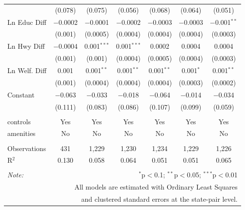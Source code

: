 \begin{table}[!htbp]
\begin{tabular}{@{\extracolsep{5pt}}lcccccc}
  & (0.078) & (0.075) & (0.056) & (0.068) & (0.064) & (0.051) \\ 
  Ln Educ Diff & $-$0.0002 & $-$0.0001 & $-$0.0002 & $-$0.0003 & $-$0.0003 & $-$0.001$^{**}$ \\ 
  & (0.001) & (0.0005) & (0.0004) & (0.0004) & (0.0004) & (0.0003) \\ 
  Ln Hwy Diff & $-$0.0004 & 0.001$^{***}$ & 0.001$^{***}$ & 0.0002 & 0.0004 & 0.0004 \\ 
  & (0.001) & (0.001) & (0.0004) & (0.0005) & (0.0004) & (0.0003) \\ 
  Ln Welf. Diff & 0.001 & 0.001$^{**}$ & 0.001$^{**}$ & 0.001$^{**}$ & 0.001$^{*}$ & 0.001$^{**}$ \\ 
  & (0.001) & (0.0004) & (0.0004) & (0.0004) & (0.0003) & (0.0002) \\ 
  Constant & $-$0.063 & $-$0.033 & $-$0.018 & $-$0.064 & $-$0.014 & $-$0.034 \\ 
  & (0.111) & (0.083) & (0.086) & (0.107) & (0.099) & (0.059) \\ 
 \hline \\[-1.8ex] 
controls & Yes & Yes & Yes & Yes & Yes & Yes \\ 
amenities & No & No & No & No & No & No \\ 
\hline \\[-1.8ex] 
Observations & 431 & 1,229 & 1,230 & 1,234 & 1,229 & 1,226 \\ 
R$^{2}$ & 0.130 & 0.058 & 0.064 & 0.051 & 0.051 & 0.065 \\ 
\hline 
\hline \\[-1.8ex] 
\textit{Note:}  & \multicolumn{6}{r}{$^{*}$p$<$0.1; $^{**}$p$<$0.05; $^{***}$p$<$0.01} \\ 
 & \multicolumn{6}{r}{All models are estimated with Ordinary Least Squares} \\ 
 & \multicolumn{6}{r}{and clustered standard errors at the state-pair level.} \\ 
\end{tabular} 
\end{table} 
